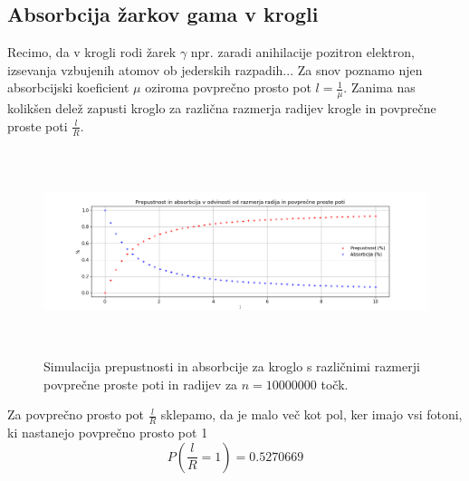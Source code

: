 \documentclass[11pt, a4paper]{article}
\begin{document}
\subsection{Absorbcija žarkov gama v krogli}
Recimo, da v krogli rodi žarek $\gamma$ npr. zaradi anihilacije pozitron elektron, izsevanja vzbujenih atomov ob jederskih razpadih... Za snov poznamo njen absorbcijski koeficient $\mu$ oziroma povprečno prosto pot $l = \frac{1}{\mu}$. Zanima nas kolikšen delež zapusti kroglo za različna razmerja radijev krogle in povprečne proste poti $\frac{l}{R}$.
\begin{figure}[H]
\hspace*{-2.5cm}  
  \includegraphics[width=22cm, height=6cm]{prepustnost_absorbcija.png}
 \caption{Simulacija prepustnosti in absorbcije za kroglo s različnimi razmerji povprečne proste poti in radijev za $n=10000000$ točk.}
\end{figure} 
Za povprečno prosto pot $\frac{l}{R}$ sklepamo, da je malo več kot pol, ker imajo vsi fotoni, ki nastanejo povprečno prosto pot 1
\begin{equation}
P ( \frac{l}{R} = 1) = 0.5270669
\end{equation}
\end{document}
